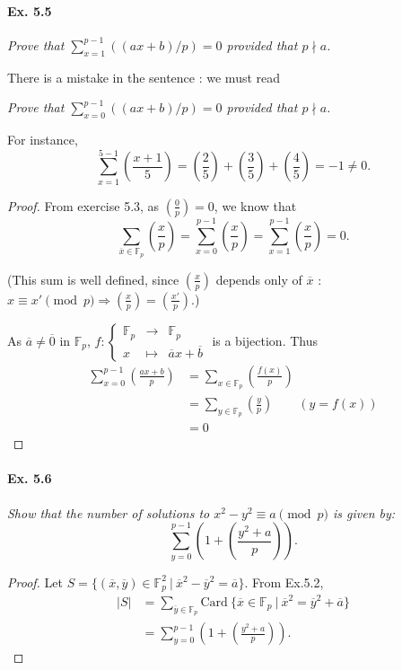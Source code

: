 \documentclass[11pt,a4paper]{article}
\newcommand{\F}{\mathbb{F}}
\newcommand{\legendre}[2]{\genfrac{(}{)}{}{}{#1}{#2}}
\begin{document}
\paragraph{Ex. 5.5}

{\it  Prove that $\sum_{x=1}^{p-1} ((ax + b)/p) = 0$ provided that $p \nmid a$.}

There is a mistake in the sentence : we must read 

{\it  Prove that $\sum_{x=0}^{p-1} ((ax + b)/p) = 0$ provided that $p \nmid a$.}

For instance, 
$$\sum_{x=1}^{5-1} \legendre{x+1}{5} = \legendre{2}{5} +  \legendre{3}{5}+  \legendre{4}{5} = -1\neq 0.$$
\begin{proof} 
From exercise 5.3, as $\legendre{0}{p} = 0$, we know that
$$\sum_{\overline{x} \in \F_p} \legendre{x}{p} = \sum _{x=0}^{p-1} \legendre{x}{p} = \sum_{x=1}^{p-1} \legendre{x}{p} =0.$$

(This sum is well defined, since $\legendre{x}{p}$ depends only of $\overline{x}$ : $x\equiv x' \pmod p \Rightarrow \legendre{x}{p} =\legendre{x'}{p}$.)

As $\overline{a} \neq \overline{0}$ in $\F_p$,
$
f :
\left\{
\begin{array}{ccc}
  \F_p &\to   &\F_p   \\
  x & \mapsto   & \overline{a} x+\overline{b}
 \end{array}
\right.
$ is a bijection. Thus
\begin{align*}
\sum_{x=0}^{p-1} \legendre{ax+b}{p} & = \sum_{x \in \F_p} \legendre{f(x)}{p}\\
&=\sum_{y \in \F_p} \legendre{y}{p}\qquad (y = f(x))\\
&= 0
\end{align*}
\end{proof}

\paragraph{Ex. 5.6}

{\it  Show that the number of solutions to $x^2 - y^2 \equiv a \pmod p$ is given by:
$$
  \sum_{y=0}^{p-1}\left(1+\legendre{y^2 + a}{p}\right).
$$

}

\begin{proof}
Let $S =\{(\overline{x},\overline{y}) \in \F_p^2\ \vert \ \overline{x}^2 - \overline{y}^2 = \overline{a}\} $.
From Ex.5.2,
\begin{align*}
\vert S \vert &= \sum_{\overline{y} \in \F_p} \mathrm{Card} \ \{\overline{x} \in \F_p\ \vert \ \overline{x}^2 = \overline{y}^2 + \overline{a}\} \\
&= \sum_{y=0}^{p-1}\left(1+\legendre{y^2 + a}{p}\right).
\end{align*}
\end{proof}
\end{document}
